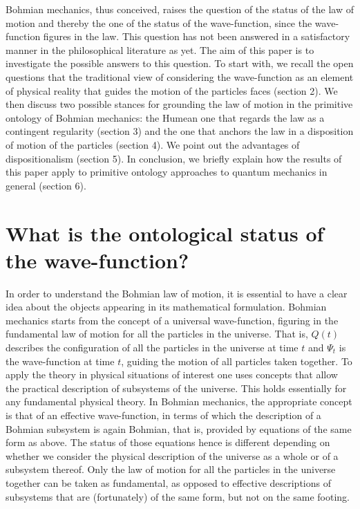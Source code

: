 \documentclass[12pt]{article}
\theoremstyle{definition}
\begin{document}
Bohmian mechanics, thus conceived, raises the question of the status of the law of motion and thereby the one of the status of the wave-function, since the wave-function figures in the law. This question has not been answered in a satisfactory manner in the philosophical literature as yet. The aim of this paper is to investigate the possible answers to this question. To start with, we recall the open questions that the traditional view of considering the wave-function as an element of physical reality that guides the motion of the particles faces (section 2). We then discuss two possible stances for grounding the law of motion in the primitive ontology of Bohmian mechanics: the Humean one that regards the law as a contingent regularity (section 3) and the one that anchors the law in a disposition of motion of the particles (section 4). We point out the advantages of dispositionalism (section 5). In conclusion, we briefly explain how the results of this paper apply to primitive ontology approaches to quantum mechanics in general (section 6).

\section{What is the ontological status of the wave-function?}
In order to understand the Bohmian law of motion, it is essential to have a clear idea about the objects appearing in its mathematical formulation. Bohmian mechanics starts from the concept of a universal wave-function, figuring in the fundamental law of motion for all the particles in the universe. That is, $Q(t)$ describes the configuration of all the particles in the universe at time $t$ and $\Psi_t$ is the wave-function at time $t$, guiding the motion of all particles taken together. To apply the theory in physical situations of interest one uses concepts that allow the practical description of subsystems of the universe. This holds essentially for any fundamental physical theory. In Bohmian mechanics, the appropriate concept is that of an effective wave-function, in terms of which the description of a Bohmian subsystem is again Bohmian, that is, provided by equations of the same form as above. The status of those equations hence is different depending on whether we consider the physical description of the universe as a whole or of a subsystem thereof. Only the law of motion for all the particles in the universe together can be taken as fundamental, as opposed to effective descriptions of subsystems that are (fortunately) of the same form, but not on the same footing.
\end{document}
